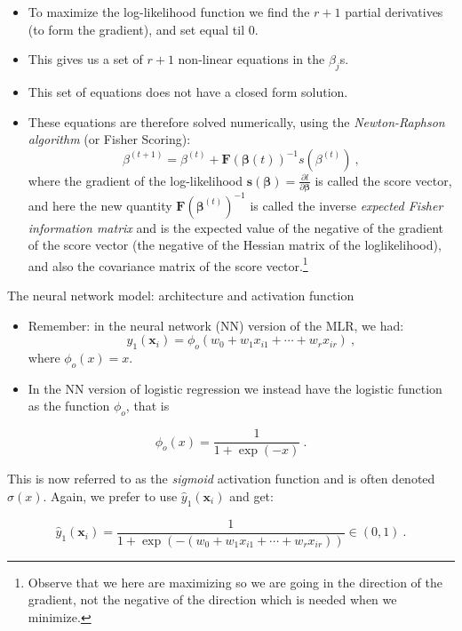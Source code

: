 \documentclass[10pt,ignorenonframetext,]{beamer}
\providecommand{\tightlist}{%
  \setlength{\itemsep}{0pt}\setlength{\parskip}{0pt}}
\begin{document}
\begin{frame}

\begin{itemize}
\tightlist
\item
  To maximize the log-likelihood function we find the \(r+1\) partial
  derivatives (to form the gradient), and set equal til 0.
\item
  This gives us a set of \(r+1\) non-linear equations in the
  \(\beta_j\)s.
\item
  This set of equations does not have a closed form solution.
\item
  These equations are therefore solved numerically, using the
  \emph{Newton-Raphson algorithm} (or Fisher Scoring):
  \[\beta^{(t+1)}=\beta^{(t)} + {\boldsymbol F}({\boldsymbol \beta}{(t)})^{-1} s(\beta^{(t)}) \ ,\]
  where the gradient of the log-likelihood
  \({\boldsymbol s}({\boldsymbol \beta})=\frac{\partial l}{\partial \boldsymbol \beta}\)
  is called the score vector, and here the new quantity
  \({\boldsymbol F}({\boldsymbol \beta}^{(t)})^{-1}\) is called the
  inverse \emph{expected Fisher information matrix} and is the expected
  value of the negative of the gradient of the score vector (the
  negative of the Hessian matrix of the loglikelihood), and also the
  covariance matrix of the score
  vector.\footnote{Observe that we here are maximizing so we are going in the direction of the gradient, not the negative of the direction which is needed when we minimize.}
\end{itemize}

\end{frame}

\begin{frame}

\begin{block}{The neural network model: architecture and activation
function}

\vspace{2mm}

\begin{itemize}
\item
  Remember: in the neural network (NN) version of the MLR, we had:
  \[ y_1({\boldsymbol x}_i)=\phi_o(w_0+w_1 x_{i1}+\cdots + w_r x_{ir}) \ , \]
  where \(\phi_o(x)=x\).
\item
  In the NN version of logistic regression we instead have the logistic
  function as the function \(\phi_o\), that is
\end{itemize}

\[ \phi_o(x)=\frac{1}{1+\exp(-x)} \ .\]

This is now referred to as the \emph{sigmoid} activation function and is
often denoted \(\sigma(x)\). Again, we prefer to use
\(\hat{y}_1({\boldsymbol x}_i)\) and get:

\[ \hat{y}_1({\boldsymbol x}_i)=\frac{1}{1+\exp(-(w_0+w_1 x_{i1}+\cdots + w_r x_{ir}))} \in (0,1) \ . \]

\end{block}

\end{frame}
\end{document}
